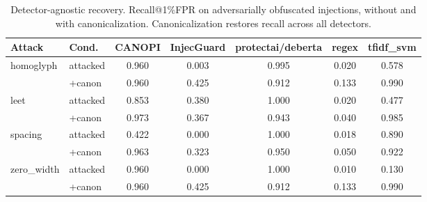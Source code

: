 \begin{table}[ht]\centering
\caption{Detector-agnostic recovery. Recall@1\%FPR on adversarially obfuscated injections, without and with canonicalization. Canonicalization restores recall across all detectors.}
\label{tab:recovery}
\small
\begin{tabular}{llccccc}
\toprule
Attack & Cond. & CANOPI & InjecGuard & protectai/deberta & regex & tfidf_svm \\
\midrule
homoglyph & attacked & 0.960 & 0.003 & 0.995 & 0.020 & 0.578 \\
 & +canon & 0.960 & 0.425 & 0.912 & 0.133 & 0.990 \\
\midrule
leet & attacked & 0.853 & 0.380 & 1.000 & 0.020 & 0.477 \\
 & +canon & 0.973 & 0.367 & 0.943 & 0.040 & 0.985 \\
\midrule
spacing & attacked & 0.422 & 0.000 & 1.000 & 0.018 & 0.890 \\
 & +canon & 0.963 & 0.323 & 0.950 & 0.050 & 0.922 \\
\midrule
zero_width & attacked & 0.960 & 0.000 & 1.000 & 0.010 & 0.130 \\
 & +canon & 0.960 & 0.425 & 0.912 & 0.133 & 0.990 \\
\midrule
\bottomrule
\end{tabular}
\end{table}